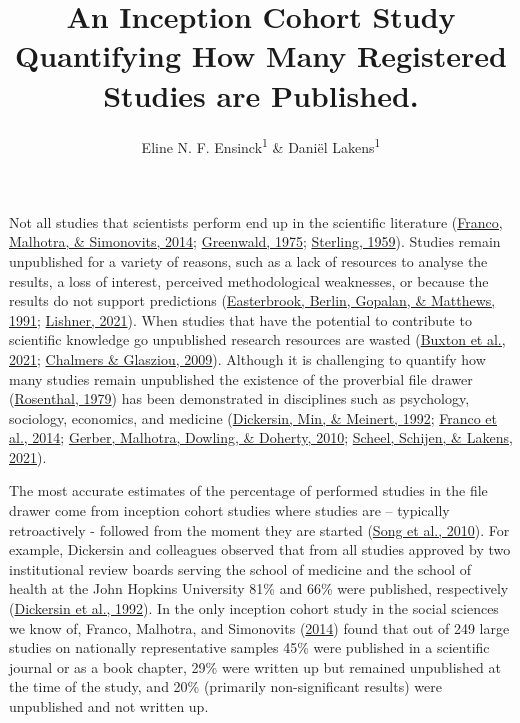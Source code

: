 \documentclass[
  ,jou, a4paper,floatsintext]{apa6}
\title{An Inception Cohort Study Quantifying How Many Registered Studies are Published.}
\author{Eline N. F. Ensinck\textsuperscript{1} \& Daniël Lakens\textsuperscript{1}}
\date{}
\affiliation{\vspace{0.5cm}\textsuperscript{1} Eindhoven University of Technology}
\begin{document}
\maketitle

Not all studies that scientists perform end up in the scientific literature (\protect\hyperlink{ref-franco_publication_2014}{Franco, Malhotra, \& Simonovits, 2014}; \protect\hyperlink{ref-greenwald_consequences_1975}{Greenwald, 1975}; \protect\hyperlink{ref-sterling_publication_1959}{Sterling, 1959}). Studies remain unpublished for a variety of reasons, such as a lack of resources to analyse the results, a loss of interest, perceived methodological weaknesses, or because the results do not support predictions (\protect\hyperlink{ref-easterbrook_publication_1991}{Easterbrook, Berlin, Gopalan, \& Matthews, 1991}; \protect\hyperlink{ref-lishner_sorting_2021}{Lishner, 2021}). When studies that have the potential to contribute to scientific knowledge go unpublished research resources are wasted (\protect\hyperlink{ref-buxton_avoiding_2021}{Buxton et al., 2021}; \protect\hyperlink{ref-chalmers_avoidable_2009}{Chalmers \& Glasziou, 2009}). Although it is challenging to quantify how many studies remain unpublished the existence of the proverbial file drawer (\protect\hyperlink{ref-rosenthal_file_1979}{Rosenthal, 1979}) has been demonstrated in disciplines such as psychology, sociology, economics, and medicine (\protect\hyperlink{ref-dickersin_factors_1992}{Dickersin, Min, \& Meinert, 1992}; \protect\hyperlink{ref-franco_publication_2014}{Franco et al., 2014}; \protect\hyperlink{ref-gerber_publication_2010}{Gerber, Malhotra, Dowling, \& Doherty, 2010}; \protect\hyperlink{ref-scheel_excess_2021}{Scheel, Schijen, \& Lakens, 2021}).

The most accurate estimates of the percentage of performed studies in the file drawer come from inception cohort studies where studies are -- typically retroactively - followed from the moment they are started (\protect\hyperlink{ref-song_dissemination_2010}{Song et al., 2010}). For example, Dickersin and colleagues observed that from all studies approved by two institutional review boards serving the school of medicine and the school of health at the John Hopkins University 81\% and 66\% were published, respectively (\protect\hyperlink{ref-dickersin_factors_1992}{Dickersin et al., 1992}). In the only inception cohort study in the social sciences we know of, Franco, Malhotra, and Simonovits (\protect\hyperlink{ref-franco_publication_2014}{2014}) found that out of 249 large studies on nationally representative samples 45\% were published in a scientific journal or as a book chapter, 29\% were written up but remained unpublished at the time of the study, and 20\% (primarily non-significant results) were unpublished and not written up.
\end{document}
